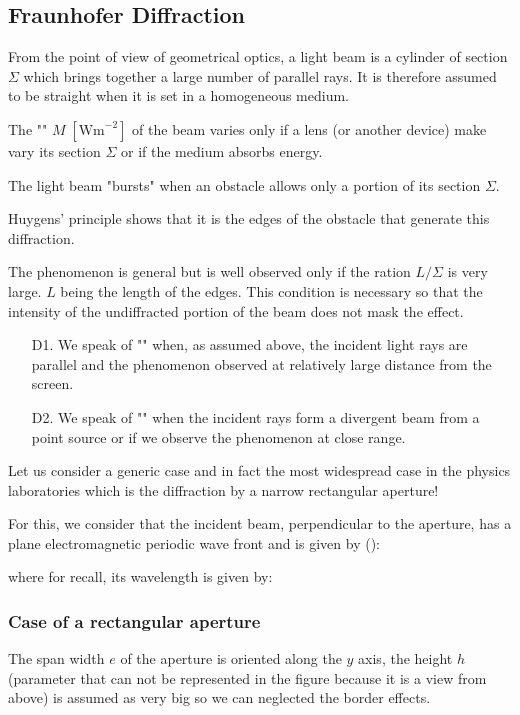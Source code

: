 	\pagebreak
	\subsection{Fraunhofer Diffraction}
	From the point of view of geometrical optics, a light beam is a cylinder of section $\Sigma$ which brings together a large number of parallel rays. It is therefore assumed to be straight when it is set in a homogeneous medium.
	
	The "" $M \; [\text{Wm}^{-2}]$ of the beam varies only if a lens (or another device) make vary its section $\Sigma$ or if the medium absorbs energy.
	
	The light beam "bursts" when an obstacle allows only a portion of its section $\Sigma$.
	
	Huygens' principle shows that it is the edges of the obstacle that generate this diffraction.
	
	The phenomenon is general but is well observed only if the ration $L/\Sigma$ is very large. $L$ being the length of the edges. This condition is necessary so that the intensity of the undiffracted portion of the beam does not mask the effect.
	
	\begin{enumerate}
		\item[D1.] We speak of "" when, as assumed above, the incident light rays are parallel and the phenomenon observed at relatively large distance from the screen.

		\item[D2.] We speak of "" when the incident rays form a divergent beam from a point source or if we observe the phenomenon at close range.
	\end{enumerate}
	
	Let us consider a generic case and in fact the most widespread case in the physics laboratories which is the diffraction by a narrow rectangular aperture!
	
	For this, we consider that the incident beam, perpendicular to the aperture, has a plane electromagnetic periodic wave front and is given by ():
	
	where for recall, its wavelength is given by:
	
	
	\subsubsection{Case of a rectangular aperture}
	The span width $e$ of the aperture is oriented along the $y$ axis, the height $h$ (parameter that can not be represented in the figure because it is a view from above) is assumed as very big so we can neglected the border effects.


